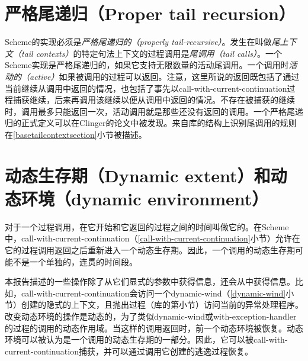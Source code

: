 \section{严格尾递归（Proper tail recursion）}
\label{proper tail recursion}

Scheme的实现必须是{\em 严格尾递归的（properly tail-recursive）}。发生在叫做\textit{尾上下文（tail contexts）}的特定句法上下文的过程调用是\textit{尾调用（tail calls）}。一个Scheme实现是严格尾递归的，如果它支持无限数量的活动尾调用。一个调用时{\em 活动的（active）}如果被调用的过程可以返回。注意，这里所说的返回既包括了通过当前继续从调用中返回的情况，也包括了事先以{\cf call-with-current-continuation}过程捕获继续，后来再调用该继续以便从调用中返回的情况。不存在被捕获的继续时，调用最多只能返回一次，活动调用就是那些还没有返回的调用。一个严格尾递归的正式定义可以在Clinger的论文\cite{propertailrecursion}中被发现。来自库的结构上识别尾调用的规则在\ref{basetailcontextsection}小节被描述。

\section{动态生存期（Dynamic extent）和动态环境（dynamic environment）}
\label{dynamicenvironmentsection}

对于一个过程调用，在它开始和它返回的过程之间的时间叫做它的。在Scheme中，{\cf call-with-current-continuation}（\ref{call-with-current-continuation}小节）允许在它的过程调用返回之后重新进入一个动态生存期。因此，一个调用的动态生存期可能不是一个单独的，连贯的时间段。

本报告描述的一些操作除了从它们显式的参数中获得信息，还会从中获得信息。比如，{\cf call-\hp{}with-\hp{}current-\hp{}continuation}会访问一个{\cf dynamic-wind}（\ref{dynamic-wind}小节）创建的隐式的上下文，且{\cf 抛出}过程（库的第小节）访问当前的异常处理程序。改变动态环境的操作是动态的，为了类似{\cf dynamic-wind}或{\cf with-exception-handler}的过程的调用的动态作用域。当这样的调用返回时，前一个动态环境被恢复。动态环境可以被认为是一个调用的动态生存期的一部分。因此，它可以被{\cf call-with-current-continuation}捕获，并可以通过调用它创建的逃逸过程恢复。

